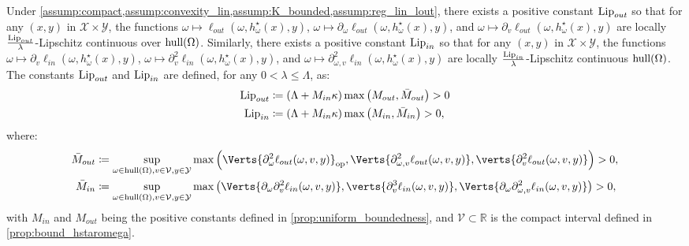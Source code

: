 \begin{proposition}\label{prop:uniform_Lipschitzness}
	Under \cref{assump:compact,assump:convexity_lin,assump:K_bounded,assump:reg_lin_lout}, there exists a positive constant $\operatorname{Lip}_{out}$ so that for any $(x,y)$ in $\mathcal{X}\times \mathcal{Y}$, 
	the functions $\omega\mapsto \ell_{out}(\omega,h_{\omega}^{\star}(x),y)$, $\omega\mapsto \partial_{\omega}\ell_{out}(\omega,h_{\omega}^{\star}(x),y)$, and $\omega\mapsto\partial_v \ell_{out}(\omega, h^\star_\omega(x), y)$ are locally $\frac{\operatorname{Lip}_{out}}{\lambda}$-Lipschitz continuous over $\textnormal{hull}(\Omega)$. Similarly, there exists a positive constant $\operatorname{Lip}_{in}$ so that for any $(x,y)$ in $\mathcal{X}\times \mathcal{Y}$, the functions $\omega\mapsto\partial_v \ell_{in}(\omega, h^\star_\omega(x), y)$, $\omega\mapsto\partial_v^2 \ell_{in}(\omega, h^\star_\omega(x), y)$, and $\omega\mapsto\partial_{\omega, v}^2 \ell_{in}(\omega, h^\star_\omega(x), y)$ are locally $\frac{\operatorname{Lip}_{in}}{\lambda}$-Lipschitz continuous $\textnormal{hull}(\Omega)$.  The constants $\operatorname{Lip}_{out}$ and $\operatorname{Lip}_{in}$ are defined, for any $0<\lambda\leq \Lambda$, as:
	\begin{align*}
	    \operatorname{Lip}_{out}&\coloneqq\left(\Lambda+M_{in}\kappa\right)\max\left(M_{out},\bar{M}_{out}\right)>0\\
	    \operatorname{Lip}_{in}&\coloneqq\left(\Lambda+M_{in}\kappa\right)\max\left(M_{in},\bar{M}_{in}\right)>0,
    \end{align*}
    where:
    \begin{align*}
      \bar{M}_{out}&\coloneqq\sup_{\omega\in\textnormal{hull}(\Omega), v\in\mathcal{V}, y\in\mathcal{Y}}\max\left(\Verts{\partial_\omega^2\ell_{out}(\omega, v, y)}_{\op},\Verts{\partial_{\omega, v}^2\ell_{out}(\omega, v, y)},\verts{\partial_v^2\ell_{out}(\omega, v, y)}\right)>0,\\
      \bar{M}_{in}&\coloneqq\sup_{\omega\in\textnormal{hull}(\Omega), v\in\mathcal{V}, y\in\mathcal{Y}}\max\left(\Verts{\partial_\omega\partial_v^2\ell_{in}(\omega, v, y)},\verts{\partial_v^3\ell_{in}(\omega, v, y)},\Verts{\partial_\omega\partial_{\omega, v}^2\ell_{in}(\omega, v, y)}\right)>0,
    \end{align*}
    with $M_{in}$ and $M_{out}$ being the positive constants defined in \cref{prop:uniform_boundedness}, and $\mathcal{V}\subset\mathbb{R}$ is the compact interval defined in \cref{prop:bound_hstaromega}.
\end{proposition}


